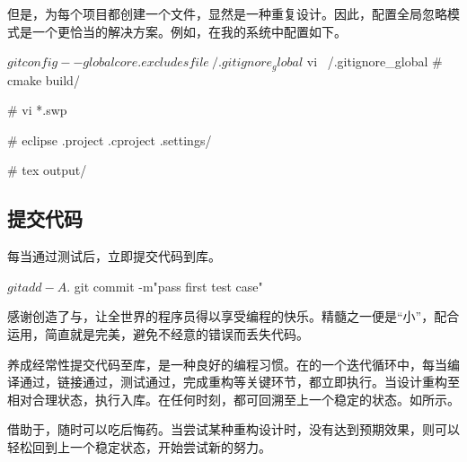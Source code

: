 \begin{content}
\begin{story}
\begin{content}
但是，为每个项目都创建一个文件，显然是一种重复设计。因此，配置全局忽略模式是一个更恰当的解决方案。例如，在我的系统中配置如下。

\begin{leftbar}
 \begin{c++}[caption={\ttfamily{Git：配置全局忽略模式}}]
$ git config --global core.excludesfile ~/.gitignore_global
$ vi ~/.gitignore_global
# cmake
build/

# vi
*.swp

# eclipse
.project
.cproject
.settings/

# tex
output/
 \end{c++}
\end{leftbar}

\end{content}

\end{story}

\subsection{提交代码}

每当通过测试后，立即提交代码到库。

\begin{leftbar}
 \begin{c++}[caption={\ttfamily{提交代码}}]
$ git add -A .
$ git commit -m"pass first test case"
 \end{c++}
\end{leftbar}

\begin{story}
  \begin{center}
  \end{center}

\begin{content}

感谢创造了与，让全世界的程序员得以享受编程的快乐。精髓之一便是“小”，配合运用，简直就是完美，避免不经意的错误而丢失代码。

养成经常性提交代码至库，是一种良好的编程习惯。在的一个迭代循环中，每当编译通过，链接通过，测试通过，完成重构等关键环节，都立即执行。当设计重构至相对合理状态，执行入库。在任何时刻，都可回溯至上一个稳定的状态。如所示。

借助于，随时可以吃后悔药。当尝试某种重构设计时，没有达到预期效果，则可以轻松回到上一个稳定状态，开始尝试新的努力。


\end{content}
\end{story}
\end{content}
